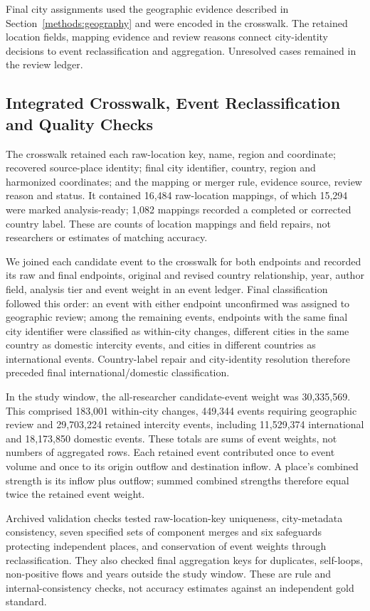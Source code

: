 Final city assignments used the geographic evidence described in Section~\ref{methods:geography} and were encoded in the crosswalk. The retained location fields, mapping evidence and review reasons connect city-identity decisions to event reclassification and aggregation. Unresolved cases remained in the review ledger.

\subsection{Integrated Crosswalk, Event Reclassification and Quality Checks}

The crosswalk retained each raw-location key, name, region and coordinate; recovered source-place identity; final city identifier, country, region and harmonized coordinates; and the mapping or merger rule, evidence source, review reason and status. It contained 16,484 raw-location mappings, of which 15,294 were marked analysis-ready; 1,082 mappings recorded a completed or corrected country label. These are counts of location mappings and field repairs, not researchers or estimates of matching accuracy.

We joined each candidate event to the crosswalk for both endpoints and recorded its raw and final endpoints, original and revised country relationship, year, author field, analysis tier and event weight in an event ledger. Final classification followed this order: an event with either endpoint unconfirmed was assigned to geographic review; among the remaining events, endpoints with the same final city identifier were classified as within-city changes, different cities in the same country as domestic intercity events, and cities in different countries as international events. Country-label repair and city-identity resolution therefore preceded final international/domestic classification.

In the study window, the all-researcher candidate-event weight was 30,335,569. This comprised 183,001 within-city changes, 449,344 events requiring geographic review and 29,703,224 retained intercity events, including 11,529,374 international and 18,173,850 domestic events. These totals are sums of event weights, not numbers of aggregated rows. Each retained event contributed once to event volume and once to its origin outflow and destination inflow. A place's combined strength is its inflow plus outflow; summed combined strengths therefore equal twice the retained event weight.

Archived validation checks tested raw-location-key uniqueness, city-metadata consistency, seven specified sets of component merges and six safeguards protecting independent places, and conservation of event weights through reclassification. They also checked final aggregation keys for duplicates, self-loops, non-positive flows and years outside the study window. These are rule and internal-consistency checks, not accuracy estimates against an independent gold standard.

